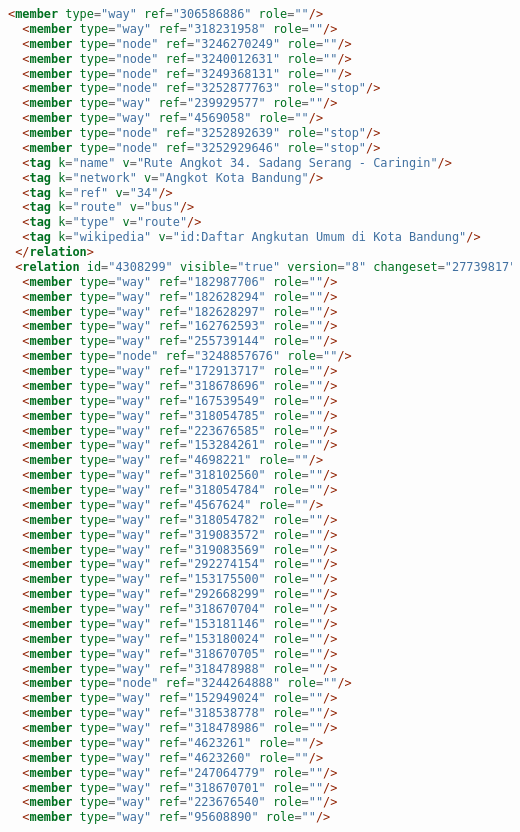 \begin{lstlisting}[language=HTML,basicstyle=\tiny,caption=bandung1.xml]
  <member type="way" ref="306586886" role=""/>
  <member type="way" ref="318231958" role=""/>
  <member type="node" ref="3246270249" role=""/>
  <member type="node" ref="3240012631" role=""/>
  <member type="node" ref="3249368131" role=""/>
  <member type="node" ref="3252877763" role="stop"/>
  <member type="way" ref="239929577" role=""/>
  <member type="way" ref="4569058" role=""/>
  <member type="node" ref="3252892639" role="stop"/>
  <member type="node" ref="3252929646" role="stop"/>
  <tag k="name" v="Rute Angkot 34. Sadang Serang - Caringin"/>
  <tag k="network" v="Angkot Kota Bandung"/>
  <tag k="ref" v="34"/>
  <tag k="route" v="bus"/>
  <tag k="type" v="route"/>
  <tag k="wikipedia" v="id:Daftar Angkutan Umum di Kota Bandung"/>
 </relation>
 <relation id="4308299" visible="true" version="8" changeset="27739817" timestamp="2014-12-27T20:32:33Z" user="gnocin" uid="2526082">
  <member type="way" ref="182987706" role=""/>
  <member type="way" ref="182628294" role=""/>
  <member type="way" ref="182628297" role=""/>
  <member type="way" ref="162762593" role=""/>
  <member type="way" ref="255739144" role=""/>
  <member type="node" ref="3248857676" role=""/>
  <member type="way" ref="172913717" role=""/>
  <member type="way" ref="318678696" role=""/>
  <member type="way" ref="167539549" role=""/>
  <member type="way" ref="318054785" role=""/>
  <member type="way" ref="223676585" role=""/>
  <member type="way" ref="153284261" role=""/>
  <member type="way" ref="4698221" role=""/>
  <member type="way" ref="318102560" role=""/>
  <member type="way" ref="318054784" role=""/>
  <member type="way" ref="4567624" role=""/>
  <member type="way" ref="318054782" role=""/>
  <member type="way" ref="319083572" role=""/>
  <member type="way" ref="319083569" role=""/>
  <member type="way" ref="292274154" role=""/>
  <member type="way" ref="153175500" role=""/>
  <member type="way" ref="292668299" role=""/>
  <member type="way" ref="318670704" role=""/>
  <member type="way" ref="153181146" role=""/>
  <member type="way" ref="153180024" role=""/>
  <member type="way" ref="318670705" role=""/>
  <member type="way" ref="318478988" role=""/>
  <member type="node" ref="3244264888" role=""/>
  <member type="way" ref="152949024" role=""/>
  <member type="way" ref="318538778" role=""/>
  <member type="way" ref="318478986" role=""/>
  <member type="way" ref="4623261" role=""/>
  <member type="way" ref="4623260" role=""/>
  <member type="way" ref="247064779" role=""/>
  <member type="way" ref="318670701" role=""/>
  <member type="way" ref="223676540" role=""/>
  <member type="way" ref="95608890" role=""/>

\end{lstlisting}

